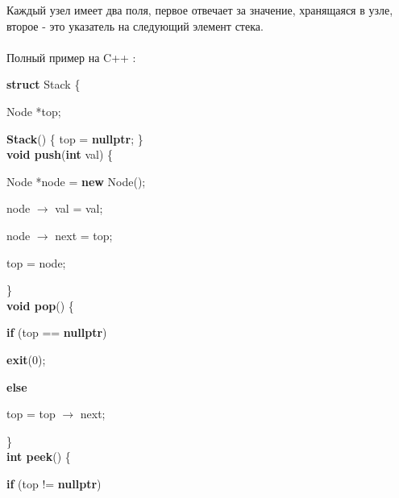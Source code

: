 Каждый узел имеет два поля, первое отвечает за значение, хранящаяся в узле, второе - это указатель на следующий элемент стека.\\\\
Полный пример на C++ :\\

\begin{algorithm}
	\begin{algorithmic}
		\State \textbf{struct} Stack \{

		\State \hspace{1cm} Node *top;

		\State \hspace{1cm} \textbf{Stack}() \{ top = \textbf{nullptr}; \}\\

		\State \hspace{1cm} \textbf{void push}(\textbf{int} val) \{

		\State \hspace{2cm} Node *node = \textbf{new} Node();

		\State \hspace{2cm} node $\rightarrow$ val = val;

		\State \hspace{2cm} node $\rightarrow$ next = top;

		\State \hspace{2cm} top = node;

		\State \hspace{1cm} \}\\

		\State \hspace{1cm} \textbf{void pop}() \{

		\State \hspace{2cm} \textbf{if} (top == \textbf{nullptr})

		\State \hspace{3cm} \textbf{exit}(0);

		\State \hspace{2cm} \textbf{else} \

		\State \hspace{3cm} top = top $\rightarrow$ next;

		\State \hspace{1cm} \}\\

		\State \hspace{1cm} \textbf{int peek}() \{

		\State \hspace{2cm} \textbf{if} (top != \textbf{nullptr})


\end{algorithmic}
\end{algorithm}
